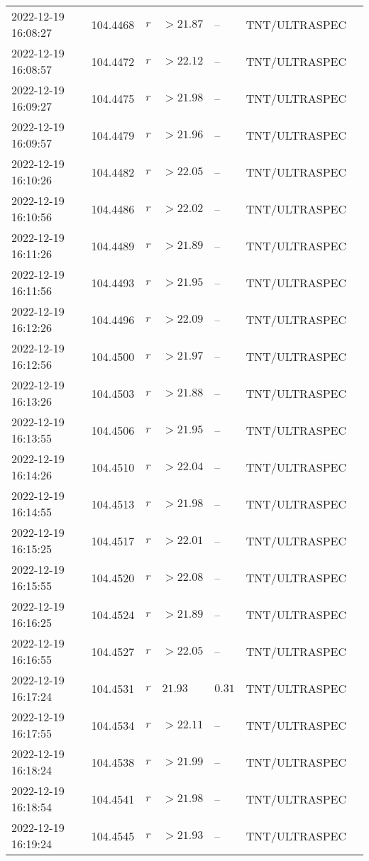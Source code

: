 \documentclass{nature_plusfigure}
\begin{document}
\begin{supplement}
\begin{center}
\begin{longtable}{lllllll}
2022-12-19 16:08:27 & 104.4468 & $r$ & $>21.87$ & -- & TNT/ULTRASPEC &  \\ 
2022-12-19 16:08:57 & 104.4472 & $r$ & $>22.12$ & -- & TNT/ULTRASPEC &  \\ 
2022-12-19 16:09:27 & 104.4475 & $r$ & $>21.98$ & -- & TNT/ULTRASPEC &  \\ 
2022-12-19 16:09:57 & 104.4479 & $r$ & $>21.96$ & -- & TNT/ULTRASPEC &  \\ 
2022-12-19 16:10:26 & 104.4482 & $r$ & $>22.05$ & -- & TNT/ULTRASPEC &  \\ 
2022-12-19 16:10:56 & 104.4486 & $r$ & $>22.02$ & -- & TNT/ULTRASPEC &  \\ 
2022-12-19 16:11:26 & 104.4489 & $r$ & $>21.89$ & -- & TNT/ULTRASPEC &  \\ 
2022-12-19 16:11:56 & 104.4493 & $r$ & $>21.95$ & -- & TNT/ULTRASPEC &  \\ 
2022-12-19 16:12:26 & 104.4496 & $r$ & $>22.09$ & -- & TNT/ULTRASPEC &  \\ 
2022-12-19 16:12:56 & 104.4500 & $r$ & $>21.97$ & -- & TNT/ULTRASPEC &  \\ 
2022-12-19 16:13:26 & 104.4503 & $r$ & $>21.88$ & -- & TNT/ULTRASPEC &  \\ 
2022-12-19 16:13:55 & 104.4506 & $r$ & $>21.95$ & -- & TNT/ULTRASPEC &  \\ 
2022-12-19 16:14:26 & 104.4510 & $r$ & $>22.04$ & -- & TNT/ULTRASPEC &  \\ 
2022-12-19 16:14:55 & 104.4513 & $r$ & $>21.98$ & -- & TNT/ULTRASPEC &  \\ 
2022-12-19 16:15:25 & 104.4517 & $r$ & $>22.01$ & -- & TNT/ULTRASPEC &  \\ 
2022-12-19 16:15:55 & 104.4520 & $r$ & $>22.08$ & -- & TNT/ULTRASPEC &  \\ 
2022-12-19 16:16:25 & 104.4524 & $r$ & $>21.89$ & -- & TNT/ULTRASPEC &  \\ 
2022-12-19 16:16:55 & 104.4527 & $r$ & $>22.05$ & -- & TNT/ULTRASPEC &  \\ 
2022-12-19 16:17:24 & 104.4531 & $r$ & $21.93$ & $0.31$ & TNT/ULTRASPEC &  \\ 
2022-12-19 16:17:55 & 104.4534 & $r$ & $>22.11$ & -- & TNT/ULTRASPEC &  \\ 
2022-12-19 16:18:24 & 104.4538 & $r$ & $>21.99$ & -- & TNT/ULTRASPEC &  \\ 
2022-12-19 16:18:54 & 104.4541 & $r$ & $>21.98$ & -- & TNT/ULTRASPEC &  \\ 
2022-12-19 16:19:24 & 104.4545 & $r$ & $>21.93$ & -- & TNT/ULTRASPEC &  \\ 

\end{longtable}
\end{center}
\end{supplement}
\end{document}
